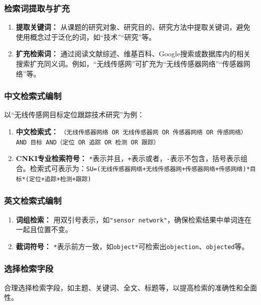 \documentclass{amznotes}
\begin{document}
\subsubsection{检索词提取与扩充}

\begin{enumerate}
  \item \textbf{提取关键词：} 从课题的研究对象、研究目的、研究方法中提取关键词，避免使用概念过于泛化的词，如“技术”“研究”等。
  \item \textbf{扩充检索词：} 通过阅读文献综述、维基百科、Google搜索或数据库内的相关搜索扩充同义词。例如，“无线传感网”可扩充为“无线传感器网络”“传感器网络”等。
\end{enumerate}

\subsubsection{中文检索式编制}

以“无线传感网目标定位跟踪技术研究”为例：

\begin{enumerate}
  \item \textbf{中文检索式：} \texttt{（无线传感器网络 OR 无线传感器网 OR 传感器网络 OR 传感网络） AND 目标 AND（定位 OR 追踪 OR 检测 OR 跟踪）}
  \item \textbf{CNKI专业检索符号：} \texttt{*}表示并且，\texttt{+}表示或者，\texttt{-}表示不包含，括号表示组合。检索式可表示为：\texttt{SU=(无线传感器网络+无线传感器网+传感器网络+传感网络)*目标*(定位+追踪+检测+跟踪)}
\end{enumerate}

\subsubsection{英文检索式编制}

\begin{enumerate}
  \item \textbf{词组检索：} 用双引号表示，如\texttt{"sensor network"}，确保检索结果中单词连在一起且位置不变。
  \item \textbf{截词符号：} \texttt{*}表示前方一致，如\texttt{object*}可检索出\texttt{objection}、\texttt{objected}等。
\end{enumerate}

\subsubsection{选择检索字段}

合理选择检索字段，如主题、关键词、全文、标题等，以提高检索的准确性和全面性。
\end{document}
